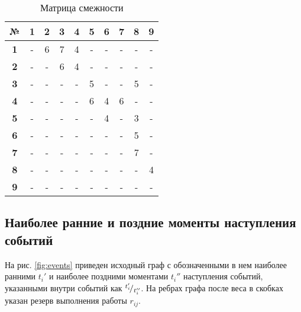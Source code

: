 \begin{table}[H]
	\centering
	\def\tabcolsep{12pt}
	\caption{Матрица смежности}
	\label{tab:1}
	\begin{tabular}{|c|c|c|c|c|c|c|c|c|c|}
		\hline
		\bf{№} & \bf{1} & \bf{2} & \bf{3} & \bf{4} & \bf{5} & \bf{6} & \bf{7} & \bf{8} & \bf{9} \\
		\hline
		\bf{1} & - & 6 & 7 & 4 & - & - & - & - & - \\ 
		\hline
		\bf{2} & - & - & 6 & 4 & - & - & - & - & - \\ 
		\hline
		\bf{3} & - & - & - & - & 5 & - & - & 5 & - \\ 
		\hline
		\bf{4} & - & - & - & - & 6 & 4 & 6 & - & - \\ 
		\hline
		\bf{5} & - & - & - & - & - & 4 & - & 3 & - \\ 
		\hline
		\bf{6} & - & - & - & - & - & - & - & 5 & - \\ 
		\hline
		\bf{7} & - & - & - & - & - & - & - & 7 & - \\ 
		\hline
		\bf{8} & - & - & - & - & - & - & - & - & 4 \\ 
		\hline
		\bf{9} & - & - & - & - & - & - & - & - & - \\ 
		\hline
	\end{tabular}
\end{table}

\subsection{Наиболее ранние и поздние моменты наступления событий}

На рис. \ref{fig:events} приведен исходный граф с обозначенными в нем наиболее ранними $t_i'$ и наиболее поздними моментами $t_i''$ наступления событий, указанными внутри событий как ${}^{t_i'}\!/_{t_i''}$. На ребрах графа после веса в скобках указан резерв выполнения работы $r_{ij}$.

